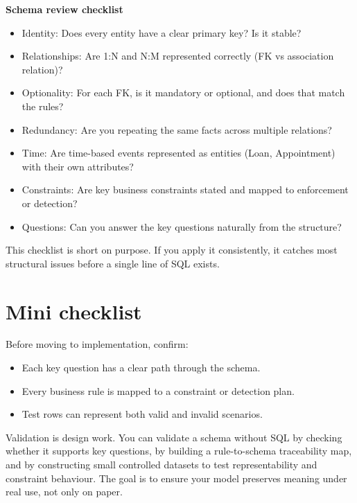 \begin{examplebox}
\textbf{Schema review checklist}\par\smallskip
\begin{itemize}
  \item Identity: Does every entity have a clear primary key? Is it stable?
  \item Relationships: Are 1:N and N:M represented correctly (FK vs association relation)?
  \item Optionality: For each FK, is it mandatory or optional, and does that match the rules?
  \item Redundancy: Are you repeating the same facts across multiple relations?
  \item Time: Are time-based events represented as entities (Loan, Appointment) with their own attributes?
  \item Constraints: Are key business constraints stated and mapped to enforcement or detection?
  \item Questions: Can you answer the key questions naturally from the structure?
\end{itemize}
\end{examplebox}

This checklist is short on purpose.
If you apply it consistently, it catches most structural issues before a single line of SQL exists.

\section{Mini checklist}
Before moving to implementation, confirm:
\begin{itemize}[leftmargin=*,nosep]
  \item Each key question has a clear path through the schema.
  \item Every business rule is mapped to a constraint or detection plan.
  \item Test rows can represent both valid and invalid scenarios.
\end{itemize}

\begin{chaptersummary}
Validation is design work.
You can validate a schema without SQL by checking whether it supports key questions, by building a rule-to-schema traceability map, and by constructing small controlled datasets to test representability and constraint behaviour.
The goal is to ensure your model preserves meaning under real use, not only on paper.
\end{chaptersummary}

